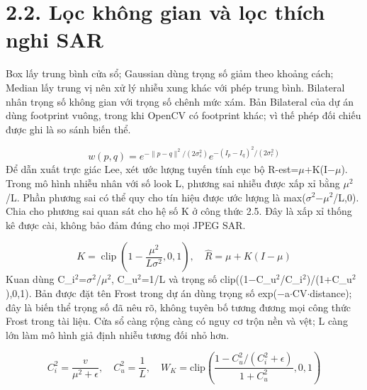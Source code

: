 \documentclass[12pt,a4paper]{extreport}
\begin{document}
\section*{2.2. Lọc không gian và lọc thích nghi SAR}
Box lấy trung bình cửa sổ; Gaussian dùng trọng số giảm theo khoảng cách; Median lấy trung vị nên xử lý nhiễu xung khác với phép trung bình. Bilateral nhân trọng số không gian với trọng số chênh mức xám. Bản Bilateral của dự án dùng footprint vuông,\allowbreak{} trong khi OpenCV có footprint khác; vì thế phép đối chiếu được ghi là so sánh biến thể.
\par
\begin{equation}w(p,q)=e^{-\|p-q\|^2/(2\sigma_s^2)}e^{-(I_p-I_q)^2/(2\sigma_r^2)}\tag{2.4}\end{equation}
Để dẫn xuất trực giác Lee,\allowbreak{} xét ước lượng tuyến tính cục bộ R-est=\allowbreak{}\ensuremath{\mu}+\allowbreak{}K(I\ensuremath{-}\ensuremath{\mu}). Trong mô hình nhiễu nhân với số look L,\allowbreak{} phương sai nhiễu được xấp xỉ bằng \ensuremath{\mu}\ensuremath{{}^2}/\allowbreak{}L. Phần phương sai có thể quy cho tín hiệu được ước lượng là max(\ensuremath{\sigma}\ensuremath{{}^2}\ensuremath{-}\ensuremath{\mu}\ensuremath{{}^2}/\allowbreak{}L,\allowbreak{}0). Chia cho phương sai quan sát cho hệ số K ở công thức 2.5. Đây là xấp xỉ thống kê được cài,\allowbreak{} không bảo đảm đúng cho mọi JPEG SAR.
\par
\begin{equation}K=\operatorname{clip}\left(1-\frac{\mu^2}{L\sigma^2},0,1\right),\quad \hat R=\mu+K(I-\mu)\tag{2.5}\end{equation}
Kuan dùng C\_i\ensuremath{{}^2}=\allowbreak{}\ensuremath{\sigma}\ensuremath{{}^2}/\allowbreak{}\ensuremath{\mu}\ensuremath{{}^2},\allowbreak{} C\_u\ensuremath{{}^2}=\allowbreak{}1/\allowbreak{}L và trọng số clip((1\ensuremath{-}C\_u\ensuremath{{}^2}/\allowbreak{}C\_i\ensuremath{{}^2})/\allowbreak{}(1+\allowbreak{}C\_u\ensuremath{{}^2}),\allowbreak{}0,\allowbreak{}1). Bản được đặt tên Frost trong dự án dùng trọng số exp(\ensuremath{-}a\ensuremath{\cdot}CV\ensuremath{\cdot}distance); đây là biến thể trọng số đã nêu rõ,\allowbreak{} không tuyên bố tương đương mọi công thức Frost trong tài liệu. Cửa sổ càng rộng càng có nguy cơ trộn nền và vệt; L càng lớn làm mô hình giả định nhiễu tương đối nhỏ hơn.
\par
\begin{equation}C_i^2=\frac{v}{\mu^2+\epsilon},\quad C_u^2=\frac{1}{L},\quad W_K=\mathrm{clip}\left(\frac{1-C_u^2/(C_i^2+\epsilon)}{1+C_u^2},0,1\right)\tag{2.6}\end{equation}
\end{document}
